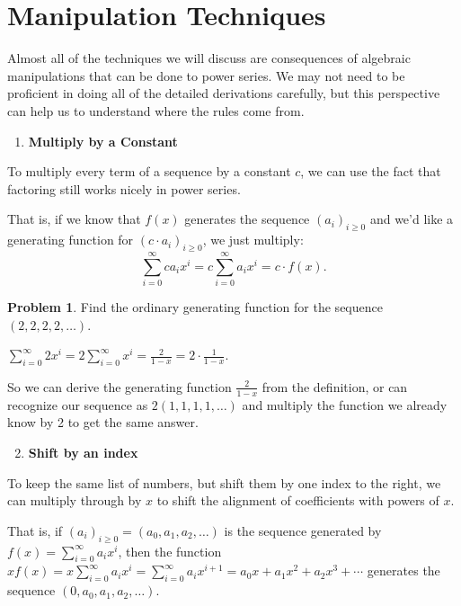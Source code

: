 \documentclass{article}
\theoremstyle{definition}
\newtheorem{problem}{Problem}
\begin{document}
\section*{Manipulation Techniques}
Almost all of the techniques we will discuss are consequences of algebraic manipulations that can be done to power series. We may not need to be proficient in doing all of the detailed derivations carefully, but this perspective can help us to understand where the rules come from.

\begin{enumerate}
  \item \textbf{Multiply by a Constant}
\end{enumerate}

To multiply every term of a sequence by a constant $c$, we can use the fact that factoring still works nicely in power series.

That is, if we know that $f(x)$ generates the sequence $\left(a_{i}\right)_{i \geq 0}$ and we'd like a generating function for $\left(c \cdot a_{i}\right)_{i \geq 0}$, we just multiply:
\[\sum_{i=0}^{\infty} c a_{i} x^{i}=c \sum_{i=0}^{\infty} a_{i} x^{i}=c \cdot f(x).\]

\begin{problem}
Find the ordinary generating function for the sequence $(2,2,2,2, \ldots)$.
\end{problem}

$\sum_{i=0}^{\infty} 2 x^{i}=2 \sum_{i=0}^{\infty} x^{i}=\frac{2}{1-x}=2 \cdot \frac{1}{1-x}$.

So we can derive the generating function $\frac{2}{1-x}$ from the definition, or can recognize our sequence as $2(1,1,1,1, \ldots)$ and multiply the function we already know by 2 to get the same answer.

\begin{enumerate}
\setcounter{enumi}{1}
\item \textbf{Shift by an index}
\end{enumerate}

To keep the same list of numbers, but shift them by one index to the right, we can multiply through by $x$ to shift the alignment of coefficients with powers of $x$.

That is, if $\left(a_{i}\right)_{i \geq 0}=\left(a_{0}, a_{1}, a_{2}, \ldots\right)$ is the sequence generated by $f(x)=\sum_{i=0}^{\infty} a_{i} x^{i}$, then the function $x f(x)=x \sum_{i=0}^{\infty} a_{i} x^{i}=\sum_{i=0}^{\infty} a_{i} x^{i+1}=a_{0} x+a_{1} x^{2}+a_{2} x^{3}+\cdots$ generates the sequence $\left(0, a_{0}, a_{1}, a_{2}, \ldots\right)$.
\end{document}
